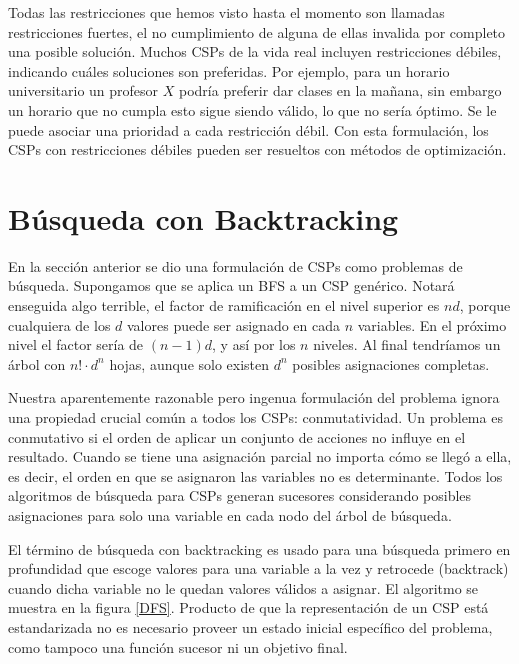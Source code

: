 Todas las restricciones que hemos visto hasta el momento son llamadas restricciones fuertes, el no cumplimiento de alguna de ellas invalida por completo una posible soluci\'on. Muchos CSPs de la vida real incluyen restricciones d\'ebiles, indicando cu\'ales soluciones son preferidas. Por ejemplo, para un horario universitario un profesor $X$ podr\'ia preferir dar clases en la mañana, sin embargo un horario que no cumpla esto sigue siendo v\'alido, lo que no ser\'ia \'optimo. Se le puede asociar una prioridad a cada restricci\'on d\'ebil. Con esta formulaci\'on, los CSPs con restricciones d\'ebiles pueden ser resueltos con m\'etodos de optimizaci\'on. 

\section{B\'usqueda con Backtracking}

En la secci\'on anterior se dio una formulaci\'on de CSPs como problemas de b\'usqueda. Supongamos que se aplica un BFS a un CSP gen\'erico. Notar\'a enseguida algo terrible, el factor de ramificaci\'on en el nivel superior es $nd$, porque cualquiera de los $d$ valores puede ser asignado en cada $n$ variables. En el pr\'oximo nivel el factor ser\'ia de $(n-1)d$, y as\'i por los $n$ niveles. Al final tendr\'iamos un \'arbol con $n! \cdot d^{n}$ hojas, aunque solo existen $d^{n}$ posibles asignaciones completas.

Nuestra aparentemente razonable pero ingenua formulaci\'on del problema ignora una propiedad crucial com\'un a todos los CSPs: conmutatividad. Un problema es conmutativo si el orden de aplicar un conjunto de acciones no influye en el resultado. Cuando se tiene una asignaci\'on parcial no importa c\'omo se lleg\'o a ella, es decir, el orden en que se asignaron las variables no es determinante. Todos los algoritmos de b\'usqueda para CSPs generan sucesores considerando posibles asignaciones para solo una variable en cada nodo del \'arbol de b\'usqueda.

El t\'ermino de b\'usqueda con backtracking es usado para una b\'usqueda primero en profundidad que escoge valores para una variable a la vez y retrocede (backtrack) cuando dicha variable no le quedan valores v\'alidos a asignar. El algoritmo se muestra en la figura \ref{DFS}. Producto de que la representaci\'on de un CSP est\'a estandarizada no es necesario proveer un estado inicial espec\'ifico del problema, como tampoco una funci\'on sucesor ni un objetivo final.

